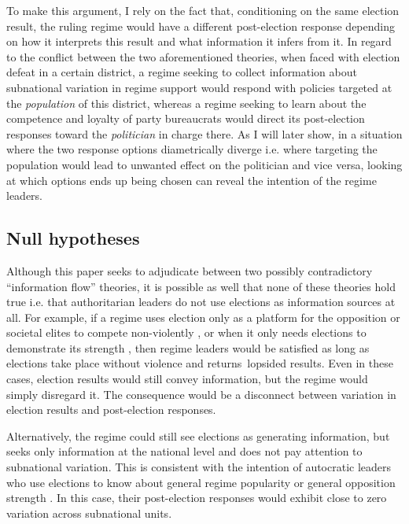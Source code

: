 \documentclass[12pt]{article}\usepackage[]{graphicx}\usepackage[]{color}
\newcommand{\1}{\mathbbm{1}}
\begin{document}
To make this argument, I rely on the fact that, conditioning on the same election result, the ruling regime would have a different post-election response depending on how it interprets this result and what information it infers from it. In regard to the conflict between the two aforementioned theories, when faced with election defeat in a certain district, a regime seeking to collect information about subnational variation in regime support would respond with policies targeted at the \textit{population} of this district, whereas a regime seeking to learn about the competence and loyalty of party bureaucrats would direct its post-election responses toward the \textit{politician} in charge there. As I will later show, in a situation where the two response options diametrically diverge i.e. where targeting the population would lead to unwanted effect on the politician and vice versa, looking at which options ends up being chosen can reveal the intention of the regime leaders.

\subsection{Null hypotheses}

Although this paper seeks to adjudicate between two possibly contradictory ``information flow'' theories, it is possible as well that none of these theories hold true i.e. that authoritarian leaders do not use elections as information sources at all. For example, if a regime uses election only as a platform for the opposition or societal elites to compete non-violently \citep{AR2005, Cox2009, LustOkar2006}, or when it only needs elections to demonstrate its strength \citep{Geddes2005, Simpser2013}, then regime leaders would be satisfied as long as elections take place without violence and returns\ lopsided results. Even in these cases, election results would still convey information, but the regime would simply disregard it. The consequence would be a disconnect between variation in election results and post-election responses.

Alternatively, the regime could still see elections as generating information, but seeks only information at the national level and does not pay attention to subnational variation. This is consistent with the intention of autocratic leaders who use elections to know about general regime popularity \citep{Miller2015} or general opposition strength \citep{Geddes2005}. In this case, their post-election responses would exhibit close to zero variation across subnational units.
\end{document}
